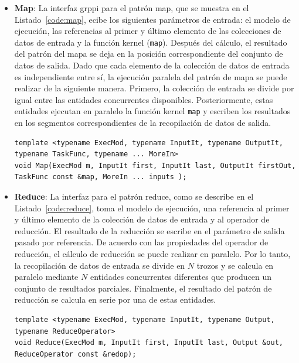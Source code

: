 \begin{itemize}
    \item \textbf{Map}: La interfaz \acrshort{grppi} para el patrón map, que se muestra en el Listado~\ref{code:map}, ecibe los siguientes parámetros de entrada: el modelo de ejecución, las referencias al primer y último elemento de las colecciones de datos de entrada y la función kernel (\texttt{map}). Después del cálculo, el resultado del patrón del mapa se deja en la posición correspondiente del conjunto de datos de salida. Dado que cada elemento de la colección de datos de entrada es independiente entre sí, la ejecución paralela del patrón de mapa se puede realizar de la siguiente manera. Primero, la colección de entrada se divide por igual entre las entidades concurrentes disponibles. Posteriormente, estas entidades ejecutan en paralelo la función kernel \texttt{map} y escriben los resultados en los segmentos correspondientes de la recopilación de datos de salida.
    
    \vspace{0.35cm}
    \begin{lstlisting}[frame=single,label={code:map},caption={Interfaz Map.}]
template <typename ExecMod, typename InputIt, typename OutputIt, typename TaskFunc, typename ... MoreIn>
void Map(ExecMod m, InputIt first, InputIt last, OutputIt firstOut, TaskFunc const &map, MoreIn ... inputs );
\end{lstlisting}
\vspace{0.35cm}
    
    \item \textbf{Reduce}: La interfaz para el patrón reduce, como se describe en el Listado~\ref{code:reduce}, toma el modelo de ejecución, una referencia al primer y último elemento de la colección de datos de entrada y al operador de reducción. El resultado de la reducción se escribe en el parámetro de salida pasado por referencia. De acuerdo con las propiedades del operador de reducción, el cálculo de reducción se puede realizar en paralelo. Por lo tanto, la recopilación de datos de entrada se divide en $N$ trozos y se calcula en paralelo mediante $N$ entidades concurrentes diferentes que producen un conjunto de resultados parciales. Finalmente, el resultado del patrón de reducción se calcula en serie por una de estas entidades.
    
    \vspace{0.35cm}
    \begin{lstlisting}[frame=single,label={code:reduce},caption={Interfaz Reduce.}]
template <typename ExecMod, typename InputIt, typename Output, typename ReduceOperator>
void Reduce(ExecMod m, InputIt first, InputIt last, Output &out, ReduceOperator const &redop);
\end{lstlisting}
\vspace{0.35cm}
    

\end{itemize}
